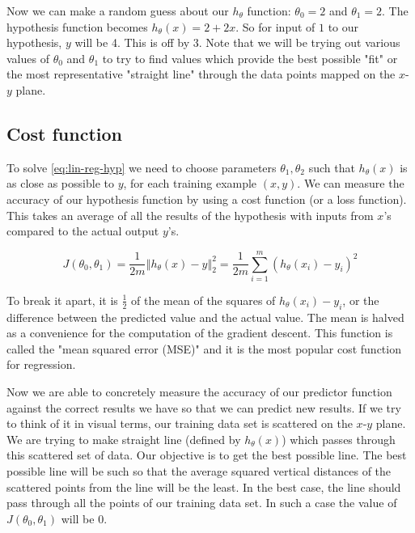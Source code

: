 \documentclass[a4paper,11pt]{report}
\newcommand{\norm}[1]{\left\Vert#1\right\Vert}
\newcommand{\ds}{\displaystyle}
\begin{document}
Now we can make a random guess about our $h_\theta$ function: $\theta_0 = 2$ and $\theta_1 = 2$. The hypothesis function becomes $h_\theta(x) = 2 + 2x$.
So for input of $1$ to our hypothesis, $y$ will be 4. This is off by $3$. Note that we will be trying out various values of $\theta_0$ and $\theta_1$ to try to find values which provide the best possible "fit" or the most representative "straight line" through the data points mapped on the $x$-$y$ plane.

\subsection*{Cost function}

To solve \eqref{eq:lin-reg-hyp} we need to choose parameters $\theta_1, \theta_2$ such that $h_\theta(x)$ is as close as possible to $y$, for each training example $(x, y)$.
We can measure the accuracy of our hypothesis function by using a cost function (or a loss function).
This takes an average of all the results of the hypothesis with inputs from $x$'s compared to the actual output $y$'s.

\begin{equation}\label{eq:lin-reg-cost}
J(\theta_0, \theta_1) = \dfrac{1}{2m} \ds\norm{h_\theta(x) - y}_2^2  = \dfrac{1}{2m}\ds \sum_{i=1}^m \left(h_\theta(x_{i}) - y_{i}\right)^2
\end{equation}

To break it apart, it is $\frac{1}{2}$ of the mean of the squares of $h_\theta(x_{i}) - y_{i}$, or the difference between the predicted value and the actual value. The mean is halved as a convenience for the computation of the gradient descent. This function is called the "mean squared error (MSE)" and it is the most popular cost function for regression.

Now we are able to concretely measure the accuracy of our predictor function against the correct results we have so that we can predict new results.
If we try to think of it in visual terms, our training data set is scattered on the $x$-$y$ plane. We are trying to make straight line (defined by $h_\theta(x)$) which passes through this scattered set of data. Our objective is to get the best possible line. The best possible line will be such so that the average squared vertical distances of the scattered points from the line will be the least. In the best case, the line should pass through all the points of our training data set. In such a case the value of $J(\theta_0, \theta_1)$ will be 0.
\end{document}
